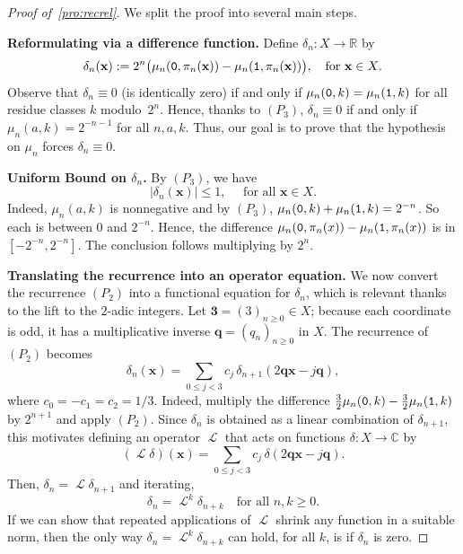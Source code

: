 \documentclass[12pt,reqno]{article}
\DeclareMathOperator{\Lop}{\mathcal{L}}
\begin{document}
\begin{proof}[Proof of~\cref{pro:recrel}] We split the proof into several main steps. 
  
{\bf Reformulating via a difference function.}  Define $\delta_n : X \to \mathbb{R}$ by
\[
    \delta_n(\mathbf{x})
    := 2^n\bigl(\mu_n({\tt 0},\pi_n(\mathbf{x})) - \mu_n({\tt 1},\pi_n(\mathbf{x}))\bigr),
    \quad \text{for $\mathbf{x}\in X$.}
\]
Observe that $\delta_n\equiv 0$ (is identically zero) if and only if $\mu_n({\tt 0},k) =\mu_n({\tt 1},k)$ for all residue classes $k$ modulo~$2^n$. 
Hence, thanks to $(P_3)$, $\delta_n\equiv 0$ if and only if $\mu_n(a,k) = 2^{-n-1}$ for all $n,a,k$.
Thus, our goal is to prove that the hypothesis on $\mu_n$ forces $\delta_n \equiv 0$.

{\bf Uniform Bound on $\delta_n$.} By $(P_3)$,  we have
\begin{equation}\label{eq:bound_delta}
|\delta_n(\mathbf{x})| \le 1,\quad \text{ for all }\mathbf{x}\in X.  
\end{equation}
Indeed, $\mu_n(a,k)$ is nonnegative and by $(P_3)$, $\mu_n({\tt 0},k)+\mu_n({\tt 1},k)=2^{-n}$. So each is between $0$ and $2^{-n}$. Hence, the difference $\mu_n({\tt 0},\pi_n(x)) - \mu_n({\tt 1},\pi_n(x))$ is in $[-2^{-n},2^{-n}]$. The conclusion follows multiplying by $2^n$.


{\bf Translating the recurrence into an operator equation.} We now convert the recurrence $(P_2)$ into a functional equation for $\delta_n$,  which is relevant thanks to the lift to the $2$-adic integers. Let $\mathbf{3}= (3)_{n\ge0} \in X$; because each coordinate is odd, it has a multiplicative inverse
$\mathbf{q}=(q_n)_{n\ge0}$ in $X$. The recurrence of $(P_2)$ becomes
\[
    \delta_n(\mathbf{x}) =
    \sum_{0\le j < 3} c_j \,\delta_{n+1}(2 \mathbf{q} \mathbf{x} - j \mathbf{q}),
\]
where $c_0 = -c_1 = c_2 = 1/3$. Indeed, multiply the difference $\frac{3}{2}\mu_n({\tt 0},k)-\frac{3}{2}\mu_n({\tt 1},k)$ by $2^{n+1}$ and apply $(P_2)$. 
Since $\delta_{n}$ is obtained as a linear combination of $\delta_{n+1}$, this motivates defining an operator $\Lop$ that acts on functions
$\delta : X \to \mathbb{C}$ by
\[  (\Lop\delta)(\mathbf{x}) =
    \sum_{0\le j<3} c_j \,\delta(2 \mathbf{q} \mathbf{x} - j \mathbf{q}).
\]
Then, $\delta_n=\Lop\delta_{n+1}$ and iterating, 
\[
    \delta_n = \Lop^k \delta_{n+k}
    \quad\text{for all $n,k\ge0$.}
\]
If we can show that repeated applications of $\Lop$ shrink any function in a suitable norm, then the only way $\delta_n = \Lop^k \delta_{n+k}$  can hold, for all $k$, is if $\delta_n$ is zero.



\end{proof}
\end{document}
